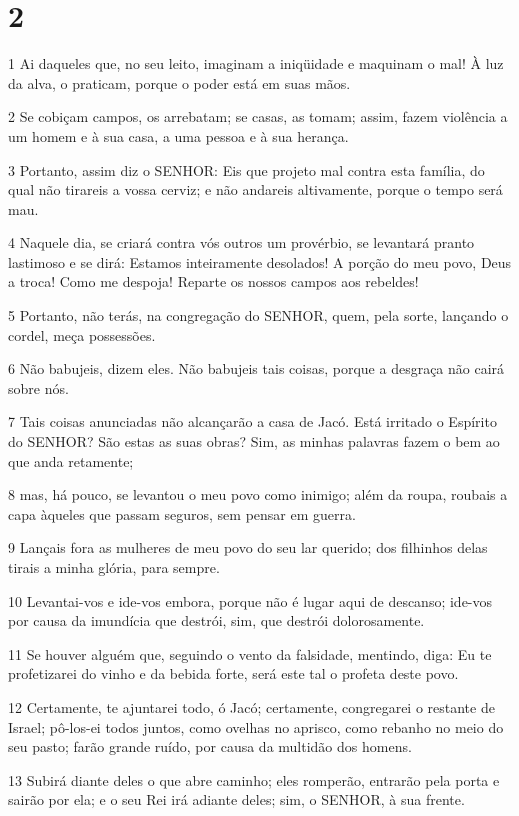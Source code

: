 \chapter{2}

\par 1 Ai daqueles que, no seu leito, imaginam a iniqüidade e maquinam o mal! À luz da alva, o praticam, porque o poder está em suas mãos.
\par 2 Se cobiçam campos, os arrebatam; se casas, as tomam; assim, fazem violência a um homem e à sua casa, a uma pessoa e à sua herança.
\par 3 Portanto, assim diz o SENHOR: Eis que projeto mal contra esta família, do qual não tirareis a vossa cerviz; e não andareis altivamente, porque o tempo será mau.
\par 4 Naquele dia, se criará contra vós outros um provérbio, se levantará pranto lastimoso e se dirá: Estamos inteiramente desolados! A porção do meu povo, Deus a troca! Como me despoja! Reparte os nossos campos aos rebeldes!
\par 5 Portanto, não terás, na congregação do SENHOR, quem, pela sorte, lançando o cordel, meça possessões.
\par 6 Não babujeis, dizem eles. Não babujeis tais coisas, porque a desgraça não cairá sobre nós.
\par 7 Tais coisas anunciadas não alcançarão a casa de Jacó. Está irritado o Espírito do SENHOR? São estas as suas obras? Sim, as minhas palavras fazem o bem ao que anda retamente;
\par 8 mas, há pouco, se levantou o meu povo como inimigo; além da roupa, roubais a capa àqueles que passam seguros, sem pensar em guerra.
\par 9 Lançais fora as mulheres de meu povo do seu lar querido; dos filhinhos delas tirais a minha glória, para sempre.
\par 10 Levantai-vos e ide-vos embora, porque não é lugar aqui de descanso; ide-vos por causa da imundícia que destrói, sim, que destrói dolorosamente.
\par 11 Se houver alguém que, seguindo o vento da falsidade, mentindo, diga: Eu te profetizarei do vinho e da bebida forte, será este tal o profeta deste povo.
\par 12 Certamente, te ajuntarei todo, ó Jacó; certamente, congregarei o restante de Israel; pô-los-ei todos juntos, como ovelhas no aprisco, como rebanho no meio do seu pasto; farão grande ruído, por causa da multidão dos homens.
\par 13 Subirá diante deles o que abre caminho; eles romperão, entrarão pela porta e sairão por ela; e o seu Rei irá adiante deles; sim, o SENHOR, à sua frente.

